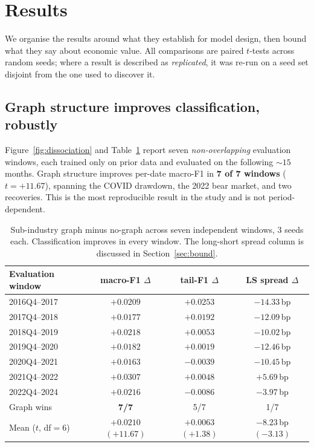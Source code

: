 \section{Results}

We organise the results around what they establish for model design, then
bound what they say about economic value. All comparisons are paired
$t$-tests across random seeds; where a result is described as
\emph{replicated}, it was re-run on a seed set disjoint from the one used to
discover it.

\subsection{Graph structure improves classification, robustly}
Figure~\ref{fig:dissociation} and Table~\ref{tab:periods} report seven \emph{non-overlapping} evaluation
windows, each trained only on prior data and evaluated on the following
${\sim}15$ months. Graph structure improves per-date macro-F1 in
\textbf{7 of 7 windows} ($t=+11.67$), spanning the COVID drawdown, the 2022
bear market, and two recoveries. This is the most reproducible result in the
study and is not period-dependent.

\begin{table}[h]
\centering
\begin{tabular}{lccc}
\toprule
Evaluation window & macro-F1 $\Delta$ & tail-F1 $\Delta$ & LS spread $\Delta$ \\
\midrule
2016Q4--2017 & $+0.0209$ & $+0.0253$ & $-14.33$\,bp \\
2017Q4--2018 & $+0.0177$ & $+0.0192$ & $-12.09$\,bp \\
2018Q4--2019 & $+0.0218$ & $+0.0053$ & $-10.02$\,bp \\
2019Q4--2020 & $+0.0182$ & $+0.0019$ & $-12.46$\,bp \\
2020Q4--2021 & $+0.0163$ & $-0.0039$ & $-10.45$\,bp \\
2021Q4--2022 & $+0.0307$ & $+0.0048$ & $+5.69$\,bp \\
2022Q4--2024 & $+0.0216$ & $-0.0086$ & $-3.97$\,bp \\
\midrule
Graph wins & \textbf{7/7} & 5/7 & 1/7 \\
Mean ($t$, df$=6$) & $\mathbf{+0.0210}$ $(+11.67)$ & $+0.0063$ $(+1.38)$ & $-8.23$\,bp $(-3.13)$ \\
\bottomrule
\end{tabular}
\caption{Sub-industry graph minus no-graph across seven independent windows,
3 seeds each. Classification improves in every window. The long-short spread
column is discussed in Section~\ref{sec:bound}.}
\label{tab:periods}
\end{table}

